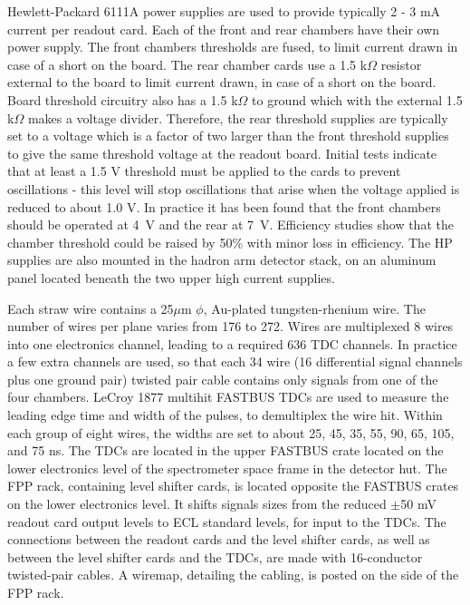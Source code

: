 {Hewlett-Packard 6111A power supplies are used to provide typically
2 - 3 mA current per readout card.
Each of the front and rear chambers have their own power supply.  
The front chambers thresholds are fused, 
to limit current drawn in case of a short on the board.
The rear chamber cards use a 1.5 k$\Omega$ resistor external to the board
to limit current drawn, in case of a short on the board.
Board threshold circuitry also has a 1.5 k$\Omega$ to ground which
with the external 1.5 k$\Omega$ makes a voltage divider. Therefore,
the rear threshold supplies are typically set to a voltage which is
a factor of two larger than the front threshold supplies to give the
same threshold voltage at the readout board.
Initial tests indicate that at least a 1.5 V threshold must be applied to the
cards to prevent oscillations - this level will stop oscillations that arise
when the voltage applied is reduced to about 1.0 V.
In practice it has been found that the front chambers should be operated
at 4~V and the rear at 7~V. Efficiency studies show that the chamber
threshold could be raised by 50\% with minor loss in efficiency.
The HP supplies are also mounted in the hadron arm detector stack, on an
aluminum panel located beneath the two upper high current supplies.

Each straw wire contains a 25$\mu$m $\phi$, Au-plated
tungsten-rhenium wire.
The number of wires per plane varies from 176 to 272.
Wires are multiplexed 8 wires into one electronics channel,
leading to a required 636 TDC channels.
In practice a few extra channels are used, so that each 34 wire
(16 differential signal channels plus one ground pair)
twisted pair cable contains only signals from one of the four chambers.
LeCroy 1877 multihit FASTBUS TDCs are used to measure the leading edge time
and width of the pulses, to demultiplex the wire hit.
Within each group of eight wires, the widths are set to about
25, 45, 35, 55, 90, 65, 105, and 75 ns.
The TDCs are located in the upper FASTBUS crate located on the lower
electronics level of the spectrometer space frame in the detector hut.
The FPP rack, containing level shifter cards, is located opposite the
FASTBUS crates on the lower electronics level.
It shifts signals sizes from the reduced $\pm$50 mV readout card output levels
to ECL standard levels, for input to the TDCs.
The connections between the readout cards and the level shifter cards,
as well as between the level shifter cards and the TDCs,
are made with 16-conductor twisted-pair cables. 
A wiremap, detailing the cabling, is posted on the side of the FPP rack.

}
